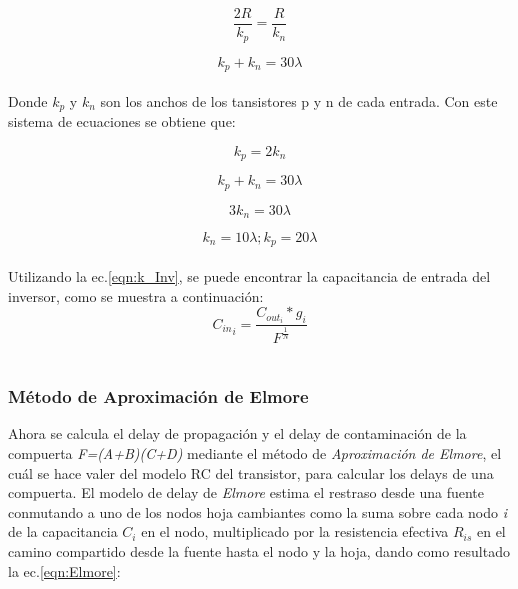 \documentclass[12pt,a4paper]{article} %
\begin{document}
{\begin{equation}\label{eqn:R}
\frac{2R}{k_p} = \frac{R}{k_n}
\end{equation}

\begin{equation}\label{eqn:k}
k_p + k_n = 30\lambda
\end{equation}\\

Donde \textit{$k_{p}$} y \textit{$k_{n}$} son los anchos de los tansistores p y n de cada entrada. Con este sistema de ecuaciones se obtiene que:

\begin{equation}\label{eqn:R1}
k_p = 2k_n
\end{equation}

\begin{equation}\label{eqn:k1}
k_p + k_n = 30\lambda
\end{equation}

\begin{equation}\label{eqn:k2}
3k_n = 30\lambda
\end{equation}

\begin{equation}\label{eqn:k3}
k_n = 10\lambda ; k_p = 20\lambda
\end{equation}\\

Utilizando la ec.\ref{eqn:k_Inv}, se puede encontrar la capacitancia de entrada del inversor, como se muestra a continuación:\\

\begin{equation}\label{eqn:k_Inv}
{C_{in}}_{i}= \frac{C_{out}_{i}*g_{i}}{F^{\frac{1}{N}}}
\end{equation}\\


\subsubsection{Método de Aproximación de Elmore}

Ahora se calcula el delay de propagación y el delay de contaminación de la compuerta \textit{F=(A+B)(C+D)} mediante el método de \textit{Aproximación de Elmore}, el cuál se hace valer del modelo RC del transistor, para calcular los delays de una compuerta. El modelo de delay de \textit{Elmore} estima el restraso desde una fuente conmutando a uno de los nodos hoja cambiantes como la suma sobre cada nodo \textit{i} de la capacitancia \textit{$C_{i}$} en el nodo, multiplicado por la resistencia efectiva \textit{$R_{is}$} en el camino compartido desde la fuente hasta el nodo y la hoja, dando como resultado la ec.\ref{eqn:Elmore}:

}
\end{document}
